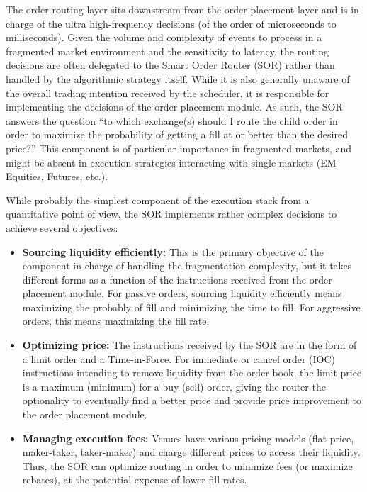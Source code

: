 The order routing layer sits downstream from the order placement layer and is in charge of the ultra high-frequency decisions (of the order of microseconds to milliseconds). Given the volume and complexity of events to process in a fragmented market environment and the sensitivity to latency, the routing decisions are often delegated to the Smart Order Router (SOR) rather than handled by the algorithmic strategy itself. While it is also generally unaware of the overall trading intention received by the scheduler, it is responsible for implementing the decisions of the order placement module. As such, the SOR answers the question ``to which exchange(s) should I route the child order in order to maximize the probability of getting a fill at or better than the desired price?'' This component is of particular importance in fragmented markets, and might be absent in execution strategies interacting with single markets (EM Equities, Futures, etc.). 


While probably the simplest component of the execution stack from a quantitative point of view, the SOR implements rather complex decisions to achieve several objectives: 

\begin{itemize}
\item \textbf{Sourcing liquidity efficiently:} This is the primary objective of the component in charge of handling the fragmentation complexity, but it takes different forms as a function of the instructions received from the order placement module. For passive orders, sourcing liquidity efficiently means maximizing the probably of fill and minimizing the time to fill. For aggressive orders, this means maximizing the fill rate.

\item \textbf{Optimizing price:} The instructions received by the SOR are in the form of a limit order and a Time-in-Force. For immediate or cancel order (IOC) instructions intending to remove liquidity from the order book, the limit price is a maximum (minimum) for a buy (sell) order, giving the router the optionality to eventually find a better price and provide price improvement to the order placement module.

\item \textbf{Managing execution fees:} Venues have various pricing models (flat price, maker-taker, taker-maker) and charge different prices to access their liquidity. Thus, the SOR can optimize routing in order to minimize fees (or maximize rebates), at the potential expense of lower fill rates.
\end{itemize}


